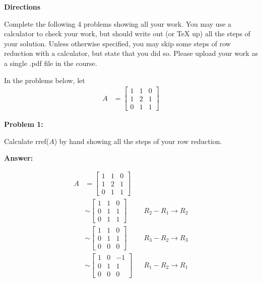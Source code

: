\documentclass[10pt,letterpaper,final]{report}
\newcommand{\reason}[1]{&& \text{#1}}
\begin{document}
\begin{center}
  \vline
\end{center}

\medskip

\noindent\textbf{Directions}

Complete the following 4 problems showing all your work. You may use a calculator to check your work, but should write out (or TeX up) all the steps of your solution. Unless otherwise speciﬁed, you may skip some steps of row reduction with a calculator, but state that you did so. Please upload your work as a single .pdf ﬁle in the course.

In the problems below, let
\begin{align*}
  A & =
  \begin{bmatrix}
    1 & 1 & 0 \\
    1 & 2 & 1 \\
    0 & 1 & 1
  \end{bmatrix}
\end{align*}

\medskip
\noindent\textbf{Problem 1:}
\medskip

Calculate rref($A$) by hand showing all the steps of your row reduction.

\medskip
\noindent\textbf{Answer:}
\medskip

\begin{align*}
  A & =
  \begin{bmatrix}
    1 & 1 & 0 \\
    1 & 2 & 1 \\
    0 & 1 & 1
  \end{bmatrix}                           \\[1ex]
    & \sim
  \begin{bmatrix}
    1 & 1 & 0 \\
    0 & 1 & 1 \\
    0 & 1 & 1
  \end{bmatrix} \reason{$R_2 - R_1 \to R_2$} \\[1ex]
    & \sim
  \begin{bmatrix}
    1 & 1 & 0 \\
    0 & 1 & 1 \\
    0 & 0 & 0
  \end{bmatrix} \reason{$R_3 - R_2 \to R_3$} \\[1ex]
    & \sim
  \begin{bmatrix}
    1 & 0 & -1 \\
    0 & 1 & 1  \\
    0 & 0 & 0
  \end{bmatrix} \reason{$R_1 - R_2 \to R_1$}
\end{align*}
\end{document}
